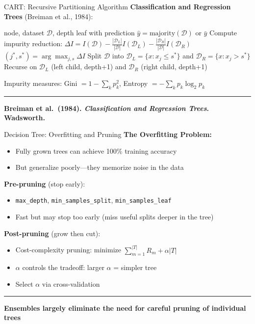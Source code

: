 \documentclass[8pt,aspectratio=169]{beamer}
\newcommand{\bottomnote}[1]{%
\vfill
\vspace{-2mm}
\textcolor{mllavender2}{\rule{\textwidth}{0.4pt}}
\vspace{1mm}
\footnotesize
\textbf{#1}
}
\begin{document}
\begin{frame}{CART: Recursive Partitioning Algorithm}
\textbf{Classification and Regression Trees} (Breiman et al., 1984):

\medskip
\begin{algorithmic}[1]
\REQUIRE node, dataset $\mathcal{D}$, depth
  \RETURN leaf with prediction $\hat{y} = \text{majority}(\mathcal{D})$ or $\bar{y}$
\ENDIF
{}
  \STATE Compute impurity reduction: $\Delta I = I(\mathcal{D}) - \frac{|\mathcal{D}_L|}{|\mathcal{D}|} I(\mathcal{D}_L) - \frac{|\mathcal{D}_R|}{|\mathcal{D}|} I(\mathcal{D}_R)$
\ENDFOR
\STATE $(j^*, s^*) = \arg\max_{j,s} \Delta I$
\STATE Split $\mathcal{D}$ into $\mathcal{D}_L = \{x : x_j \leq s^*\}$ and $\mathcal{D}_R = \{x : x_j > s^*\}$
\STATE Recurse on $\mathcal{D}_L$ (left child, depth+1) and $\mathcal{D}_R$ (right child, depth+1)
\end{algorithmic}

\medskip
Impurity measures: Gini $= 1 - \sum_k p_k^2$, \; Entropy $= -\sum_k p_k \log_2 p_k$

\bottomnote{Breiman et al.\ (1984). \textit{Classification and Regression Trees}. Wadsworth.}
\end{frame}

\begin{frame}[t]{Decision Tree: Overfitting and Pruning}
\textbf{The Overfitting Problem:}
\begin{itemize}
\item Fully grown trees can achieve 100\% training accuracy
\item But generalize poorly---they memorize noise in the data
\end{itemize}

\vspace{0.3em}
\textbf{Pre-pruning} (stop early):
\begin{itemize}
\item \texttt{max\_depth}, \texttt{min\_samples\_split}, \texttt{min\_samples\_leaf}
\item Fast but may stop too early (miss useful splits deeper in the tree)
\end{itemize}

\vspace{0.3em}
\textbf{Post-pruning} (grow then cut):
\begin{itemize}
\item Cost-complexity pruning: minimize $\sum_{m=1}^{|T|} R_m + \alpha |T|$
\item $\alpha$ controls the tradeoff: larger $\alpha$ = simpler tree
\item Select $\alpha$ via cross-validation
\end{itemize}
\bottomnote{Ensembles largely eliminate the need for careful pruning of individual trees}
\end{frame}
\end{document}
